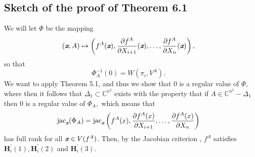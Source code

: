 \documentclass[sigconf]{acmart}
\def\xb{\textit{\textbf{x}}}
\def\C{\mathbb{C}}
\def\jac{ \textrm{jac}}
\def\pa{\partial}
\begin{document}
\subsection{Sketch of the proof of Theorem 6.1}
%
We will let $\Phi$ be the mapping 
\[
(\xb,A) \mapsto \left(f^A(\xb), \frac{\partial f^A}{\partial X_{i+1}}(\xb),\hdots,\frac{\partial f^A}{\partial X_n}(\xb)\right),
\] 
so that 
\[
\Phi_A^{-1}(0)= W(\pi_i,V^A).
\]
We want to apply Theorem 5.1, and thus we show that $0$ is a regular value of $\Phi$, where then it follows that $\Delta_1 \subset \C^{n^2}$ exists with the property that if $A \in \C^{n^2}-\Delta_1$ then $0$ is a regular value of $\Phi_A,$ which means that 
\[
\jac_{\xb}(\Phi_A) = \jac_{\xb}\left(f^A(x),\frac{\pa f^A(x)}{\pa X_{i+1}},\hdots,\frac{\pa f^A(x)}{\pa X_n}\right)
\]
has full rank for all $\xb \in V(f^A)$. Then, by the Jacobian criterion \cite[Theorem 16.19]{ECA}, $f^A$ satisfies $\textbf{H}_i^{'}(1),\textbf{H}_i^{'}(2)$ and $\textbf{H}_i^{'}(3)$.
\end{document}
